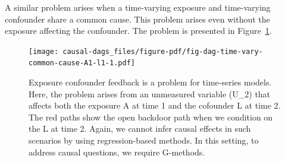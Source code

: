 \documentclass[
  singlecolumn]{article}
\begin{document}
A similar problem arises when a time-varying exposure and time-varying
confounder share a common cause. This problem arises even without the
exposure affecting the confounder. The problem is presented in
Figure~\ref{fig-dag-time-vary-common-cause-A1-l1}.

\begin{figure}

{\centering \texttt{[image: causal-dags\_files/figure-pdf/fig-dag-time-vary-common-cause-A1-l1-1.pdf]}

}

\caption{\label{fig-dag-time-vary-common-cause-A1-l1}Exposure confounder
feedback is a problem for time-series models. Here, the problem arises
from an unmeasured variable (U\_2) that affects both the exposure A at
time 1 and the cofounder L at time 2. The red paths show the open
backdoor path when we condition on the L at time 2. Again, we cannot
infer causal effects in such scenarios by using regression-based
methods. In this setting, to address causal questions, we require
G-methods.}

\end{figure}
\end{document}
